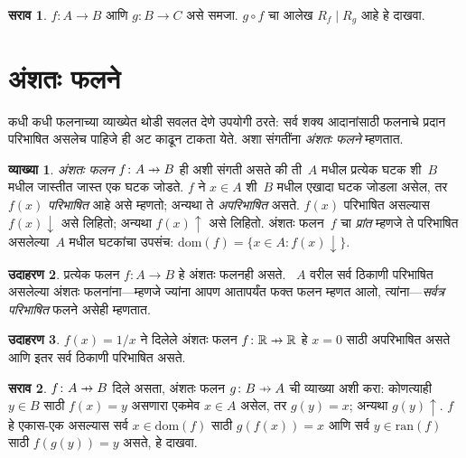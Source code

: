 \documentclass[11pt,a4paper,openany]{book}
\theoremstyle{definition}
\newtheorem{defn}{व्याख्या}[section]
\newtheorem{ex}[defn]{उदाहरण}
\newtheorem{prob}{सराव}[chapter]
\newenvironment{explain}{}{}
\newcommand{\Setabs}[2]{\{#1:#2\}}
\newcommand{\Real}{\mathbb{R}}
\newcommand{\dom}[1]{\mathrm{dom}(#1)}
\newcommand{\ran}[1]{\mathrm{ran}(#1)}
\newcommand{\comp}[2]{#2\circ #1}
\newcommand{\pto}{\mathrel{\ooalign{\hfil$\mapstochar\mkern 5mu$\hfil\cr$\to$}}}
\newcommand{\fdefined}{\downarrow}
\newcommand{\fundefined}{\uparrow}
\begin{document}
\begin{prob}
$f \colon A \to B$ आणि $g \colon B \to C$ असे समजा.
$\comp{f}{g}$ चा आलेख $R_f \mid R_g$ आहे हे दाखवा.
\end{prob}










\section{अंशतः फलने}\label{sfr:fun:par:sec}

\begin{explain}
कधी कधी फलनाच्या व्याख्येत थोडी सवलत देणे उपयोगी ठरते: सर्व शक्य
आदानांसाठी फलनाचे प्रदान परिभाषित असलेच पाहिजे ही अट काढून टाकता
येते. अशा संगतींना \emph{अंशतः फलने} म्हणतात.
\end{explain}

\begin{defn}
\emph{अंशतः फलन} $f \colon A \pto B$ ही अशी संगती असते की ती~$A$
मधील प्रत्येक घटक शी~$B$ मधील जास्तीत जास्त एक घटक
जोडते. $f$ ने $x \in A$ शी~$B$ मधील एखादा घटक जोडला असेल, तर
$f(x)$ \emph{परिभाषित} आहे असे म्हणतो; अन्यथा ते \emph{अपरिभाषित}
असते. $f(x)$ परिभाषित असल्यास $f(x) \fdefined$ असे लिहितो;
अन्यथा $f(x) \fundefined$ असे लिहितो. अंशतः फलन~$f$ चा \emph{प्रांत}
म्हणजे ते परिभाषित असलेल्या~$A$ मधील घटकांचा उपसंच:
$\dom{f} = \Setabs{x \in A}{f(x) \fdefined}$.
\end{defn}

\begin{ex}
प्रत्येक फलन $f\colon A \to B$ हे अंशतः फलनही असते. ~$A$ वरील
सर्व ठिकाणी परिभाषित असलेल्या अंशतः फलनांना---म्हणजे ज्यांना आपण
आतापर्यंत फक्त फलन म्हणत आलो, त्यांना---\emph{सर्वत्र परिभाषित}
फलने असेही म्हणतात.
\end{ex}

\begin{ex}
$f(x) = 1/x$ ने दिलेले अंशतः फलन $f \colon \Real \pto \Real$
हे $x = 0$ साठी अपरिभाषित असते आणि इतर सर्व ठिकाणी परिभाषित असते.
\end{ex}

\begin{prob}
$f\colon A \pto B$ दिले असता, अंशतः फलन $g\colon B \pto A$ ची
व्याख्या अशी करा: कोणत्याही $y \in B$ साठी $f(x) = y$ असणारा एकमेव
$x \in A$ असेल, तर $g(y) = x$; अन्यथा $g(y) \fundefined$.
$f$ हे एकास-एक असल्यास सर्व $x \in \dom{f}$ साठी $g(f(x)) = x$
आणि सर्व $y \in \ran{f}$ साठी $f(g(y)) = y$ असते, हे दाखवा.
\end{prob}
\end{document}
